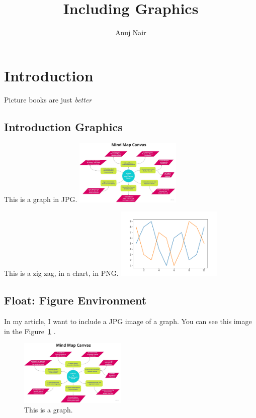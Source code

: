 \documentclass{proc}
\title{Including Graphics}
\author{Anuj Nair}
\date{}
\begin{document}
\maketitle

\section{Introduction}

Picture books are just \emph{better}

\subsection{Introduction Graphics}

  This is a graph in JPG.
  \includegraphics[width=2in]{graph.jpg}

  This is a zig zag, in a chart, in PNG.
				\includegraphics[width=2in]{chart.png}


   

\subsection{Float: Figure Environment}

  In my article, I want to include a JPG image of a graph. You can see this image in the Figure~\ref{fig:graph} .
  \begin{figure}[htbp]
    \begin{center}
				\includegraphics[width=2in]{graph.jpg}
        \caption{This is a graph.}
        \label{fig:graph}
    \end{center}
  \end{figure}
  
\end{document}
